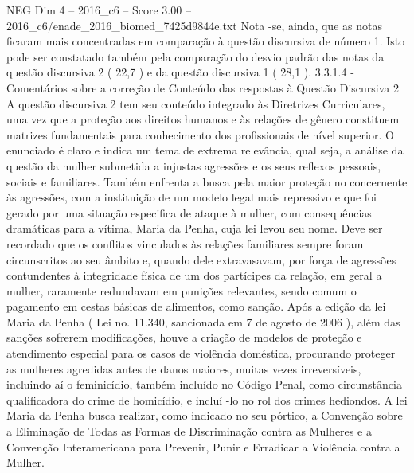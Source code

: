 \begin{textsample}{NEG Dim 4 – 2016\_c6 – Score 3.00 – 2016\_c6/enade\_2016\_biomed\_7425d9844e.txt}
Nota -se, ainda, que as notas ficaram mais concentradas em comparação à questão discursiva de número 1.
Isto pode ser constatado também pela comparação do desvio padrão das notas da questão discursiva 2 ( 22,7 ) e da questão discursiva 1 ( 28,1 ). 3.3.1.4 - Comentários sobre a correção de Conteúdo das respostas à Questão Discursiva 2 A questão discursiva 2 tem seu conteúdo integrado às Diretrizes Curriculares, uma vez que a proteção aos direitos humanos e às relações de gênero constituem matrizes fundamentais para conhecimento dos profissionais de nível superior.
O enunciado é claro e indica um tema de extrema relevância, qual seja, a análise da questão da mulher submetida a injustas agressões e os seus reflexos pessoais, sociais e familiares.
Também enfrenta a busca pela maior proteção no concernente às agressões, com a instituição de um modelo legal mais repressivo e que foi gerado por uma situação especifica de ataque à mulher, com consequências dramáticas para a vítima, Maria da Penha, cuja lei levou seu nome.
Deve ser recordado que os conflitos vinculados às relações familiares sempre foram circunscritos ao seu âmbito e, quando dele extravasavam, por força de agressões contundentes à integridade física de um dos partícipes da relação, em geral a mulher, raramente redundavam em punições relevantes, sendo comum o pagamento em cestas básicas de alimentos, como sanção.
Após a edição da lei Maria da Penha ( Lei no. 11.340, sancionada em 7 de agosto de 2006 ), além das sanções sofrerem modificações, houve a criação de modelos de proteção e atendimento especial para os casos de violência doméstica, procurando proteger as mulheres agredidas antes de danos maiores, muitas vezes irreversíveis, incluindo aí o feminicídio, também incluído no Código Penal, como circunstância qualificadora do crime de homicídio, e incluí -lo no rol dos crimes hediondos.
A lei Maria da Penha busca realizar, como indicado no seu pórtico, a Convenção sobre a Eliminação de Todas as Formas de Discriminação contra as Mulheres e a Convenção Interamericana para Prevenir, Punir e Erradicar a Violência contra a Mulher.

\end{textsample}
